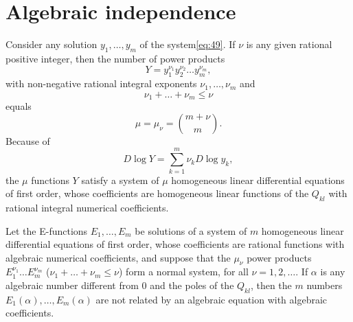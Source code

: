 \section{Algebraic independence}

Consider any solution $y_1, \dots, y_m$ of the system\eqref{eq:49}. If $\nu$ is any given rational positive integer, then the number of power products
\[Y = y_1^{\nu_1} y_2^{\nu_2} \dots y_m^{\nu_m},\]
with non-negative rational integral exponents $\nu_1, \dots, \nu_m$ and
\[\nu_1 + \dots + \nu_m \le \nu\]
equals
\[\mu = \mu_{\nu} = \binom{m+\nu}{m}.\]
Because of
\[D \log Y = \sum_{k=1}^{m} \nu_k D \log y_k,\]
the $\mu$ functions $Y$ satisfy a system of $\mu$ homogeneous linear differential equations of first order, whose coefficients are homogeneous linear functions of the $Q_{kl}$ with rational integral numerical coefficients.

\begin{mythm*}{}
Let the E-functions $E_1, \dots, E_m$ be solutions of a system of $m$ homogeneous linear differential equations of first order, whose coefficients are rational functions with algebraic numerical coefficients, and suppose that the $\mu_{\nu}$ power products $E_1^{\nu_1} \dots E_m^{\nu_m}$ ($\nu_1 + \dots + \nu_m \le \nu$) form a normal system, for all $\nu = 1, 2, \dots$. If $\alpha$ is any algebraic number different from 0 and the poles of the $Q_{kl}$, then the $m$ numbers $E_1(\alpha), \dots, E_m(\alpha)$ are not related by an algebraic equation with algebraic coefficients.
\end{mythm*}

